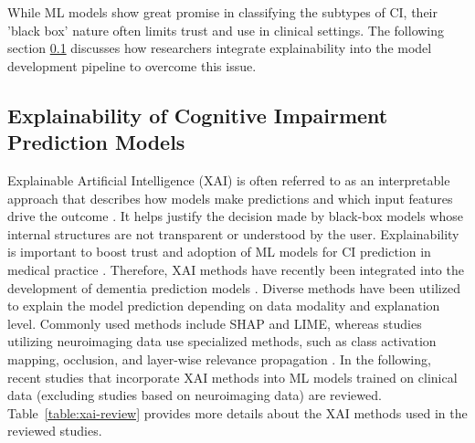 While ML models show great promise in classifying the subtypes of CI, their 'black box' nature often limits trust and use in clinical settings. The following section \ref{sec:XAI} discusses how researchers integrate explainability into the model development pipeline to overcome this issue.

\subsection{Explainability of Cognitive Impairment Prediction Models}\label{sec:XAI}
Explainable Artificial Intelligence (\acrshort{XAI}) is often referred to as an interpretable approach that describes how models make predictions and which input features drive the outcome \cite{Martin2023Interpretable, Viswan2024Explainable}. It helps justify the decision made by black-box models whose internal structures are not transparent or understood by the user. Explainability is important to boost trust and adoption of ML models for CI prediction in medical practice \cite{Viswan2024Explainable}. Therefore, XAI methods have recently been integrated into the development of dementia prediction models \cite{Martin2023Interpretable, Viswan2024Explainable}. Diverse methods have been utilized to explain the model prediction depending on data modality and explanation level. Commonly used methods include SHAP and LIME, whereas studies utilizing neuroimaging data use specialized methods, such as class activation mapping, occlusion, and layer-wise relevance propagation \cite{Martin2023Interpretable}. In the following, recent studies that incorporate XAI methods into ML models trained on clinical data (excluding studies based on neuroimaging data) are reviewed. Table~\ref{table:xai-review} provides more details about the XAI methods used in the reviewed studies.

